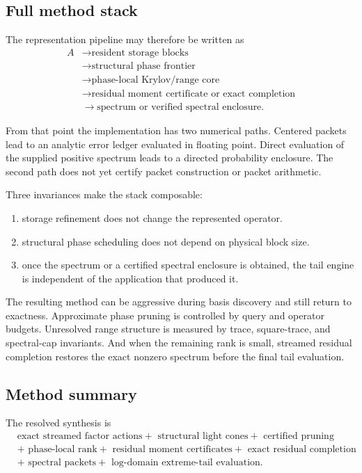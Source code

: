 \subsection{Full method stack}

The representation pipeline may therefore be written as
\[
\boxed{\begin{aligned}
A
&\longrightarrow \text{resident storage blocks}\\
&\longrightarrow \text{structural phase frontier}\\
&\longrightarrow \text{phase-local Krylov/range core}\\
&\longrightarrow \text{residual moment certificate or exact completion}\\
&\longrightarrow \text{spectrum or verified spectral enclosure}.
\end{aligned}}
\]

From that point the implementation has two numerical paths. Centered packets
lead to an analytic error ledger evaluated in floating point. Direct evaluation
of the supplied positive spectrum leads to a directed probability enclosure.
The second path does not yet certify packet construction or packet arithmetic.

Three invariances make the stack composable:
\begin{enumerate}
\item storage refinement does not change the represented operator.
\item structural phase scheduling does not depend on physical block size.
\item once the spectrum or a certified spectral enclosure is obtained, the
      tail engine is independent of the application that produced it.
\end{enumerate}

The resulting method can be aggressive during basis discovery and still return
to exactness.  Approximate phase pruning is controlled by query and operator
budgets. Unresolved range structure is measured by trace, square-trace, and
spectral-cap invariants. And when the remaining rank is small, streamed
residual completion restores the exact nonzero spectrum before the final tail
evaluation.

\subsection{Method summary}

The resolved synthesis is
\[
\boxed{\begin{aligned}
&\text{exact streamed factor actions}
+\text{ structural light cones}
+\text{ certified pruning}\\
&+\text{ phase-local rank}
+\text{ residual moment certificates}
+\text{ exact residual completion}\\
&+\text{ spectral packets}
+\text{ log-domain extreme-tail evaluation}.
\end{aligned}}
\]


